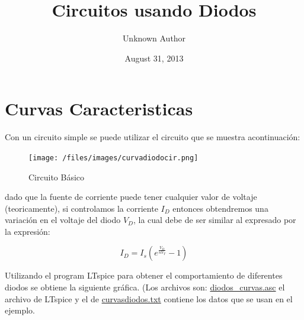 \documentclass[letterpaper,10pt,english]{/usr/lib/python3.3/site-packages/sphinx/texinputs/sphinxhowto}
\title{Circuitos usando Diodos}
\date{August 31, 2013}
\author{Unknown Author}
\begin{document}
        
            \maketitle
        

        


        
        \section{Curvas Caracteristicas}

Con un circuito simple se puede utilizar el circuito que se muestra
acontinuación:

\begin{figure}[htbp]
\centering
\texttt{[image: /files/images/curvadiodocir.png]}
\caption{Circuito Básico}
\end{figure}

dado que la fuente de corriente puede tener cualquier valor de voltaje
(teoricamente), si controlamos la corriente $I_{D}$ entonces obtendremos
una variación en el voltaje del diodo $V_{D}$, la cual debe de ser
similar al expresado por la expresión:

\begin{equation}\label{eq:diodo}
I_{D}=I_{s}\left( e^{\frac{V_{D}}{nV_{T}}}-1\right)
\end{equation}

Utilizando el program LTspice para obtener el comportamiento de
diferentes diodos se obtiene la siguiente gráfica. (Los archivos son:
\href{http://cacie.ens.uabc.mx/~mmiranda/cursos/notas/Electronica/diodos_curva.asc}{diodos\_curvas.asc}
el archivo de LTspice y el de
\href{http://cacie.ens.uabc.mx/~mmiranda/cursos/notas/Electronica/curvasdiodos.txt}{curvasdiodos.txt}
contiene los datos que se usan en el ejemplo.

\end{document}

